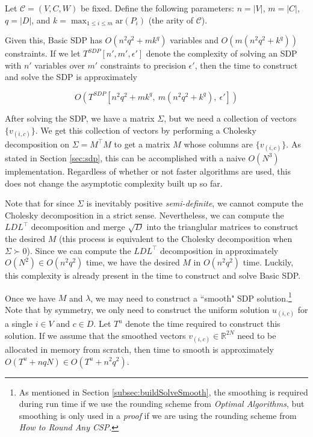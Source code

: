 \documentclass[letterpaper, 12pt]{article}
\numberwithin{equation}{section}
\begin{document}
Let $\mathcal{C} = (V,C,W)$ be fixed. Define the following parameters: $n = |V|$, $m = |C|$, $q = |D|$, and $ k = \max_{1\leq i \leq m}\text{ar}(P_i)$ (the arity of $\mathcal{C}$).

Given this, Basic SDP has $O(n^2q^2 + mk^q)$ variables and $ O(m (n^2q^2 + k^q))$ constraints. If we let $T^{SDP}\left[{n',m',\epsilon'}\right]$ denote the complexity of solving an SDP with $n'$ variables over $m'$ constraints to precision $\epsilon'$, then the time to construct and solve the SDP is approximately

\begin{equation}
O( T^{SDP}\left[n^2q^2 + mk^q,~ m (n^2q^2 + k^q),~\epsilon'\right])
\end{equation}

After solving the SDP, we have a matrix $\Sigma$, but we need a collection of vectors $\{v_{(i,c)}\}$. We get this collection of vectors by performing a Cholesky decomposition on $\Sigma = M^\intercal M$ to get a matrix $M$ whose columns are $\{v_{(i,c)}\}$. As stated in Section \ref{sec:sdp}, this can be accomplished with a naive $O(N^3)$ implementation. Regardless of whether or not faster algorithms are used, this does not change the asymptotic complexity built up so far.

Note that for since $\Sigma$ is inevitably positive \textit{semi-definite}, we cannot compute the Cholesky decomposition in a strict sense. Nevertheless, we can compute the $LDL^\intercal$ decomposition and merge $\sqrt{D}$ into the trianglular matrices to construct the desired $M$ (this process is equivalent to the Cholesky decomposition when $\Sigma \succ 0$). Since we can compute the $LDL^\intercal$ decomposition in approximately $O(N^2) \in O(n^2q^2)$ time, we have the desired $M$ in $O(n^2q^2)$ time. Luckily, this complexity is already present in the time to construct and solve Basic SDP.


Once we have $M$ and $\lambda$, we may need to construct a ``smooth" SDP solution.\footnote{As mentioned in Section \ref{subsec:buildSolveSmooth}, the smoothing is required during run time if we use the rounding scheme from \textit{Optimal Algorithms}, but smoothing is only used in a \textit{proof} if we are using the rounding scheme from \textit{How to Round Any CSP}.}  Note that by symmetry, we only need to construct the uniform solution $u_{(i,c)}$ for a single $i \in V$ and $c \in D$. Let $T^u$ denote the time required to construct this solution. If we assume that the smoothed vectors $v_{(i,c)} \in \mathbb{R}^{2N}$ need to be allocated in memory from scratch, then time to smooth is approximately $O(T^u + nq N) \in O(T^u + n^2q^2)$.
\end{document}
